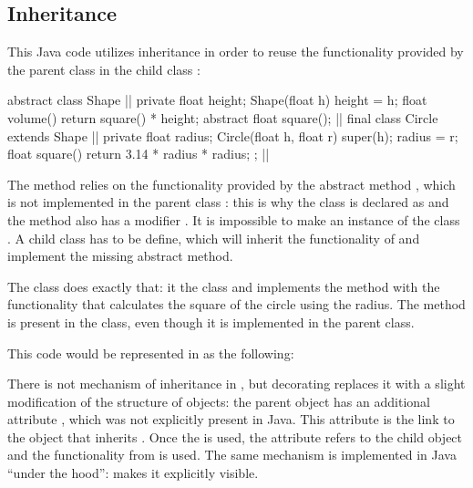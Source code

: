 \subsection{Inheritance}

This Java code utilizes inheritance in order to reuse the functionality
provided by the parent class  in the child class :

\begin{twocols}
\begin{ffcode}
abstract class Shape { |$\label{ln:java-shape}$|
  private float height;
  Shape(float h) {
    height = h;
  }
  float volume() {
    return square() * height;
  }
  abstract float square();
} |$\label{ln:java-shape-end}$|
final class Circle extends Shape { |$\label{ln:java-cicle}$|
  private float radius;
  Circle(float h, float r) {
    super(h);
    radius = r;
  }
  float square() {
    return 3.14 * radius * radius;
  }
}; |$\label{ln:java-circle-end}$|
\end{ffcode}
\end{twocols}

The method  relies on the functionality provided by the
abstract method , which is not implemented in the parent
class : this is why the class is declared as 
and the method  also has a modifier .
It is impossible to make an instance of the class . A child
class has to be define, which will inherit the functionality of
 and implement the missing abstract method.

The class  does exactly that: it  the class
 and implements the method  with the functionality
that calculates the square of the circle using the radius.
The method  is present in the  class, even
though it is implemented in the parent class.

This code would be represented in \eo{} as the following:


There is not mechanism of inheritance in \eo{}, but decorating replaces
it with a slight modification of the structure of objects: the parent
object  has an additional attribute , which was
not explicitly present in Java. This attribute is the link to the object
that inherits . Once the  is used, the attribute
refers to the child object and the functionality from  is used.
The same mechanism is implemented in Java ``under the hood'': \eo{}
makes it explicitly visible.

